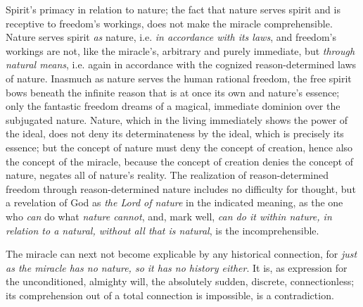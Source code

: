 \documentclass[12pt,a4paper]{book}
\begin{document}
Spirit's primacy in relation to nature; the fact that nature serves spirit and is receptive
to freedom's workings, does not make the miracle comprehensible. Nature serves spirit \emph{as}
nature, i.e. \emph{in accordance with its laws}, and freedom's workings are not, like the miracle's,
arbitrary and purely immediate, but \emph{through natural means}, i.e. again in accordance with the
cognized reason-determined laws of nature. Inasmuch as nature serves the human rational freedom, the
free spirit bows beneath the infinite reason that is at once its own and nature's essence; only the
fantastic freedom dreams of a magical, immediate dominion over the subjugated nature. Nature, which
in the living immediately shows the power of the ideal, does not deny its determinateness by the
ideal, which is precisely its essence; but the concept of nature must deny the concept of creation,
hence also the concept of the miracle, because the concept of creation denies the concept of
nature, negates all of nature's reality. The realization of reason-determined freedom through
reason-determined nature includes no difficulty for thought, but a revelation of God as \emph{the
Lord of nature} in the indicated meaning, as the one who \emph{can} do what \emph{nature cannot}, and, mark well,
\emph{can do it within nature, in relation to a natural, without all that is natural}, is the
incomprehensible.

The miracle can next not become explicable by any historical connection, for \emph{just as
the miracle has no nature, so it has no history either}. It is, as expression for the unconditioned,
almighty will, the absolutely sudden, discrete, connectionless; its comprehension out of a total
connection is impossible, is a contradiction.
\end{document}
